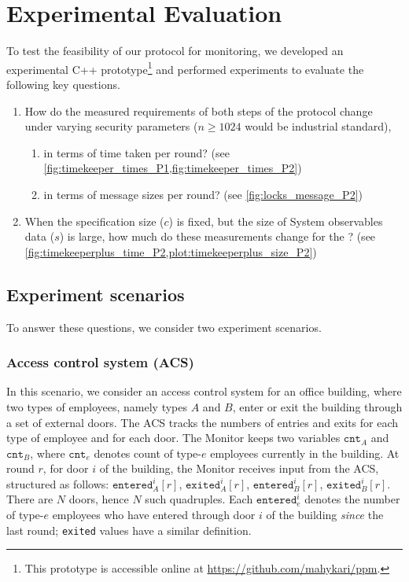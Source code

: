 \chapter{Experimental Evaluation}\label{ch:experiments}

To test the feasibility of our protocol for monitoring, we developed an experimental C++ prototype\footnote{This prototype is accessible online at \url{https://github.com/mahykari/ppm}.}
and performed experiments to evaluate the following key questions.
\begin{enumerate}
    \item How do the measured requirements of both steps of the protocol change under varying security parameters ($n\geq 1024$ would be industrial standard),
    \begin{enumerate}
        \item in terms of time taken per round? (see \cref{fig:timekeeper_times_P1,fig:timekeeper_times_P2})\label{item:securityTime}
        \item in terms of message sizes per round? (see \cref{fig:locks_message_P2})\label{item:securityMessage}
    \end{enumerate}
    \item When the specification size ($c$) is fixed, but the size of System observables data ($s$) is large, how much do these measurements change for the \protocoltwo? (see \cref{fig:timekeeperplus_time_P2,plot:timekeeperplus_size_P2})\label{item:circuitvsprogram}
\end{enumerate}

\section{Experiment scenarios}\label{sec:scenarios}

To answer these questions, we consider two experiment scenarios.

\subsection{Access control system (ACS)}\label{sec:acs}

In this scenario, we consider an access control system for an office building, where two types of employees, namely types $A$ and $B$, enter or exit the building through a set of external doors. The ACS tracks the numbers of entries and exits for each type of employee and for each door.
The Monitor keeps two variables $\texttt{cnt}_A$ and $\texttt{cnt}_B$,
where $\texttt{cnt}_e$ denotes count of type-$e$ employees currently in the building. At round $r$, for door $i$ of the building, the Monitor receives input from the ACS, structured as follows:
    $\texttt{entered}_A^i[r]$, $\texttt{exited}_A^i[r]$, $\texttt{entered}_B^i[r]$, $\texttt{exited}_B^i[r]$.
There are $N$ doors, hence $N$ such quadruples. Each $\texttt{entered}_e^i$ denotes the number of type-$e$ employees who have entered through door $i$ of the building \emph{since} the last round; \texttt{exited} values have a similar definition.

